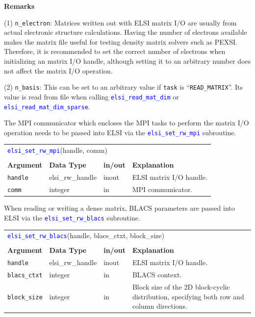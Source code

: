 \documentclass{report}
\newcommand{\api}[1]{\textcolor{blue}{\texttt{#1}}}
\begin{document}
\textbf{Remarks}

(1) \texttt{n\_electron}: Matrices written out with ELSI matrix I/O are usually from actual electronic structure calculations. Having the number of electrons available makes the matrix file useful for testing density matrix solvers such as PEXSI. Therefore, it is recommended to set the correct number of electrons when initializing an matrix I/O handle, although setting it to an arbitrary number does not affect the matrix I/O operation.

(2) \texttt{n\_basis}: This can be set to an arbitrary value if \texttt{task} is ``\texttt{READ\_MATRIX}''. Its value is read from file when calling \api{elsi\_read\_mat\_dim} or \api{elsi\_read\_mat\_dim\_sparse}.

The MPI communicator which encloses the MPI tasks to perform the matrix I/O operation needs to be passed into ELSI via the \api{elsi\_set\_rw\_mpi} subroutine.

\begin{tabular}[]{|p{25mm}|p{25mm}|p{10mm}|p{102mm}|}
\multicolumn{4}{l}{\api{elsi\_set\_rw\_mpi}(handle, comm)}\\
\multicolumn{4}{l}{}\\
\hline
\multicolumn{1}{|l|}{\textbf{Argument}} & \multicolumn{1}{l|}{\textbf{Data Type}} & \multicolumn{1}{l|}{\textbf{in/out}} & \multicolumn{1}{l|}{\textbf{Explanation}}\\
\hline
\texttt{handle} & elsi\_rw\_handle & inout & ELSI matrix I/O handle.\\
\hline
\texttt{comm}   & integer          & in    & MPI communicator.\\
\hline
\end{tabular}

When reading or writing a dense matrix, BLACS parameters are passed into ELSI via the \api{elsi\_set\_rw\_blacs} subroutine.

\begin{tabular}[]{|p{25mm}|p{25mm}|p{10mm}|p{102mm}|}
\multicolumn{4}{l}{\api{elsi\_set\_rw\_blacs}(handle, blacs\_ctxt, block\_size)}\\
\multicolumn{4}{l}{}\\
\hline
\multicolumn{1}{|l|}{\textbf{Argument}} & \multicolumn{1}{l|}{\textbf{Data Type}} & \multicolumn{1}{l|}{\textbf{in/out}} & \multicolumn{1}{l|}{\textbf{Explanation}}\\
\hline
\texttt{handle}      & elsi\_rw\_handle & inout & ELSI matrix I/O handle.\\
\hline
\texttt{blacs\_ctxt} & integer          & in    & BLACS context.\\
\hline
\texttt{block\_size} & integer          & in    & Block size of the 2D block-cyclic distribution, specifying both row and column directions.\\
\hline
\end{tabular}
\end{document}
